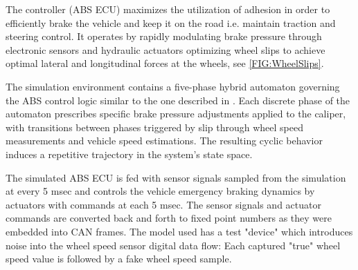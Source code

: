 \documentclass[a4paper, fleqn]{template/cas-dc}
\begin{document}
		
	The controller (ABS ECU) maximizes the utilization of adhesion in order to efficiently brake the vehicle and keep it on the road i.e. maintain traction and steering control. It operates by rapidly modulating brake pressure through electronic sensors and hydraulic actuators optimizing wheel slips to achieve optimal lateral and longitudinal forces at the wheels, see \autoref{FIG:WheelSlips}. 
	
	The simulation environment contains a five-phase hybrid automaton governing the ABS control logic similar to the one described in \cite{gerard2012improvements}. Each discrete phase of the automaton prescribes specific brake pressure adjustments applied to the caliper, with transitions between phases triggered by slip through wheel speed measurements and vehicle speed estimations. The resulting cyclic behavior induces a repetitive trajectory in the system’s state space.
	
	The simulated ABS ECU is fed with sensor signals sampled from the simulation at every 5 msec and controls the vehicle emergency braking dynamics by actuators with commands at each 5 msec. The sensor signals and actuator commands are converted back and forth to fixed point numbers as they were embedded into CAN frames. The model used has a test "device" which introduces noise into the wheel speed sensor digital data flow: Each captured "true" wheel speed value is followed by a fake wheel speed sample.
		
\end{document}
